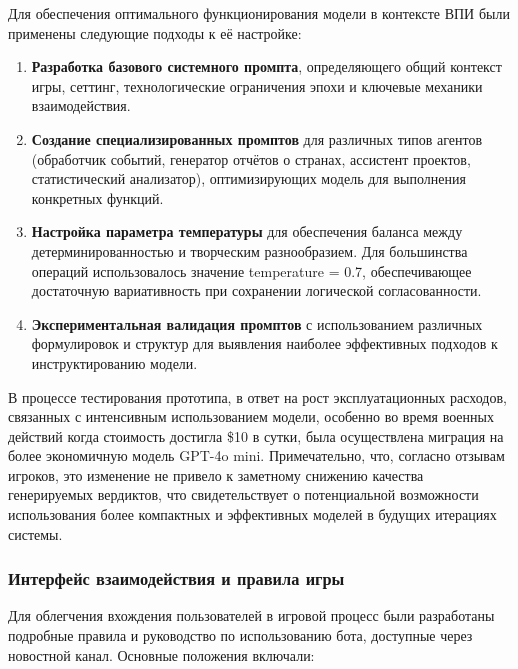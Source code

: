 Для обеспечения оптимального функционирования модели в контексте ВПИ были применены следующие подходы к её настройке:

\begin{enumerate}
    \item \textbf{Разработка базового системного промпта}, определяющего общий контекст игры, сеттинг, технологические ограничения эпохи и ключевые механики взаимодействия.

    \item \textbf{Создание специализированных промптов} для различных типов агентов (обработчик событий, генератор отчётов о странах, ассистент проектов, статистический анализатор), оптимизирующих модель для выполнения конкретных функций.

    \item \textbf{Настройка параметра температуры} для обеспечения баланса между детерминированностью и творческим разнообразием. Для большинства операций использовалось значение temperature = 0.7, обеспечивающее достаточную вариативность при сохранении логической согласованности.

    \item \textbf{Экспериментальная валидация промптов} с использованием различных формулировок и структур для выявления наиболее эффективных подходов к инструктированию модели.
\end{enumerate}

В процессе тестирования прототипа, в ответ на рост эксплуатационных расходов, связанных с интенсивным использованием модели, особенно во время военных действий когда стоимость достигла \$10 в сутки, была осуществлена миграция на более экономичную модель GPT-4o mini. Примечательно, что, согласно отзывам игроков, это изменение не привело к заметному снижению качества генерируемых вердиктов, что свидетельствует о потенциальной возможности использования более компактных и эффективных моделей в будущих итерациях системы.

\subsubsection{Интерфейс взаимодействия и правила игры}

Для облегчения вхождения пользователей в игровой процесс были разработаны подробные правила и руководство по использованию бота, доступные через новостной канал. Основные положения включали:


